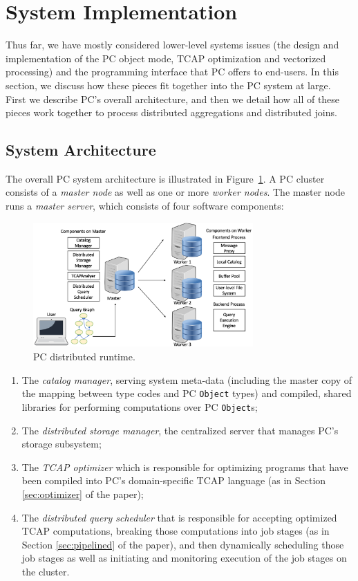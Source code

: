 
\section{System Implementation}

Thus far, we have mostly considered lower-level systems issues (the design and implementation of the PC object mode, TCAP optimization and vectorized processing) and
the programming interface that PC offers to end-users.  In this section, we discuss how these pieces fit together into the PC system at large.  First we 
describe PC's overall architecture, and then we detail how all of these pieces work together to process distributed aggregations and distributed joins.

\subsection{System Architecture}

The overall PC system architecture is illustrated in Figure~\ref{fig:arch}.
A PC cluster consists of a \emph{master node} as well as one or more \emph{worker nodes}.
The master node runs a \emph{master server}, which consists of
four software components: 

\begin{figure}
\centering
\includegraphics[width=0.75\textwidth]{arch.pdf}
  \caption{\label{fig:arch} PC distributed runtime.}
\end{figure}


\begin{enumerate}
\item The \emph{catalog manager}, serving system meta-data (including the master copy of
the mapping between type codes and PC \texttt{Object} types) and compiled, shared libraries
for performing computations over PC \texttt{Object}s;
\item The \emph{distributed storage manager}, 
the centralized server that manages PC's storage subsystem; 
\item The \emph{TCAP optimizer} which is responsible for optimizing programs that have been compiled into PC's domain-specific TCAP language (as in
Section \ref{sec:optimizer} of the paper);
\item The \emph{distributed query scheduler} that is responsible for accepting optimized TCAP computations, 
breaking those computations into job stages (as in Section \ref{sec:pipelined} of the paper), and then
dynamically scheduling those job stages as well as initiating and monitoring execution of the job stages on the cluster.
\end{enumerate}


